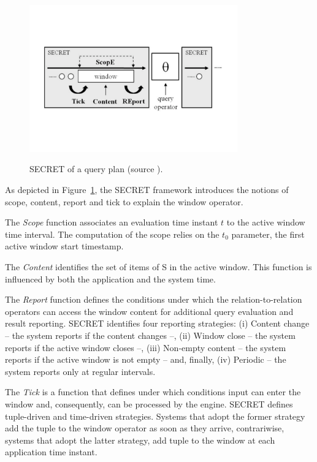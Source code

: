 \begin{figure}[h]
  \begin{center}
    \includegraphics[width=0.8\textwidth]{img/secret}\\
    \caption{SECRET of a query plan (source \cite{DBLP:journals/pvldb/BotanDDHMT10}).}
    \label{fig:secret}
  \end{center}
\end{figure}

As depicted in Figure~\ref{fig:secret}, the SECRET framework introduces the notions of scope, content, report and tick to explain the window operator.

The \textit{Scope} function associates an evaluation time instant $t$ to the active window time interval. The computation of the scope relies on the $t_0$ parameter, the first active window start timestamp.

The \textit{Content} identifies the set of items of S in the active window. This function is influenced by both the application and the system time.

The \textit{Report} function defines the conditions under which the relation-to-relation operators can access the window content for additional query evaluation and result reporting. SECRET identifies four reporting strategies: (i) Content change -- the system reports if the content changes --, (ii)  Window close -- the system reports if the active window closes --, (iii) Non-empty content -- the system reports if the active window is not empty -- and, finally, (iv) Periodic -- the system reports only at regular intervals.

The \textit{Tick} is a function that defines under which conditions input can enter the window and, consequently, can be processed by the engine. SECRET defines tuple-driven and time-driven strategies. Systems that adopt the former strategy add the tuple to the window operator as soon as they arrive, contrariwise, systems that adopt the latter strategy, add tuple to the window at each application time instant.

